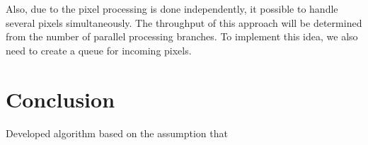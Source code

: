\documentclass[a4paper,12pt]{article} %
\begin{document}
Also, due to the pixel processing is done independently, it possible to handle several pixels simultaneously. The throughput of this approach will be determined from the number of parallel processing branches. To implement this idea, we also need to create a queue for incoming pixels. 


\section*{Conclusion}

Developed algorithm based on the assumption that    
\end{document}
